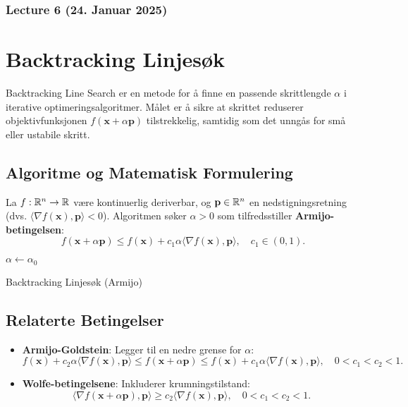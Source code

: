 \subsubsection{Lecture 6 (24. Januar 2025)}

\section*{Backtracking Linjesøk}
Backtracking Line Search er en metode for å finne en passende skrittlengde \( \alpha \) i iterative optimeringsalgoritmer. Målet er å sikre at skrittet reduserer objektivfunksjonen \( f(\bm{x} + \alpha \bm{p}) \) tilstrekkelig, samtidig som det unngås for små eller ustabile skritt.

\subsection*{Algoritme og Matematisk Formulering}
La \( f: \mathbb{R}^n \to \mathbb{R} \) være kontinuerlig deriverbar, og \( \mathbf{p} \in \mathbb{R}^n \) en nedstigningsretning (dvs. \( \langle \nabla f(\bm{x}), \bm{p} \rangle < 0 \)). Algoritmen søker \( \alpha > 0 \) som tilfredsstiller \textbf{Armijo-betingelsen}:
\begin{equation}
    f(\bm{x} + \alpha \bm{p}) \leq f(\bm{x}) + c_1 \alpha \langle \nabla f(\bm{x}), \bm{p} \rangle, \quad c_1 \in (0, 1).
\end{equation}

\begin{algorithm}[H]
    \SetAlgoLined
    \DontPrintSemicolon
    \KwOut{$\alpha$}
    $\alpha \leftarrow \alpha_0$\;
    \Return{$\alpha$}
    \caption{Backtracking Linjesøk (Armijo)}
\end{algorithm}

\subsection*{Relaterte Betingelser}
\begin{itemize}
    \item \textbf{Armijo-Goldstein}: Legger til en nedre grense for \( \alpha \):
    \begin{equation}
        f(\bm{x}) + c_2 \alpha \langle \nabla f(\bm{x}), \bm{p} \rangle \leq f(\bm{x} + \alpha \bm{p}) \leq f(\bm{x}) + c_1 \alpha \langle \nabla f(\bm{x}), \bm{p} \rangle, \quad 0 < c_1 < c_2 < 1.
    \end{equation}

    \item \textbf{Wolfe-betingelsene}: Inkluderer krumningstilstand:
    \begin{equation}
        \langle \nabla f(\bm{x} + \alpha \bm{p}), \bm{p} \rangle \geq c_2 \langle \nabla f(\bm{x}), \bm{p} \rangle, \quad 0 < c_1 < c_2 < 1.
    \end{equation}
\end{itemize}

